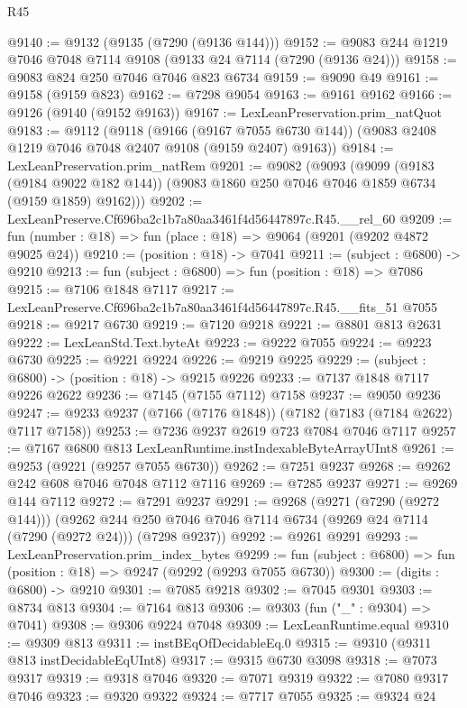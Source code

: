 \begin{lexlean}{R45}
\begin{coremodule}
{@9140 := @9132 (@9135 (@7290 (@9136 @144)))
@9152 := @9083 @244 @1219 @7046 @7048 @7114 @9108 (@9133 @24 @7114 (@7290 (@9136 @24)))
@9158 := @9083 @824 @250 @7046 @7046 @823 @6734
@9159 := @9090 @49
@9161 := @9158 (@9159 @823)
@9162 := @7298 @9054
@9163 := @9161 @9162
@9166 := @9126 (@9140 (@9152 @9163))
@9167 := LexLeanPreservation.prim_natQuot
@9183 := @9112
    (@9118
      (@9166 (@9167 @7055 @6730 @144))
      (@9083 @2408 @1219 @7046 @7048 @2407 @9108 (@9159 @2407) @9163))
@9184 := LexLeanPreservation.prim_natRem
@9201 := @9082
    (@9093
      (@9099
        (@9183 (@9184 @9022 @182 @144))
        (@9083 @1860 @250 @7046 @7046 @1859 @6734 (@9159 @1859) @9162)))
@9202 := LexLeanPreserve.Cf696ba2c1b7a80aa3461f4d56447897c.R45.__rel_60
@9209 := fun (number : @18) => fun (place : @18) => @9064 (@9201 (@9202 @4872 @9025 @24))
@9210 := (position : @18) -> @7041
@9211 := (subject : @6800) -> @9210
@9213 := fun (subject : @6800) => fun (position : @18) => @7086
@9215 := @7106 @1848 @7117
@9217 := LexLeanPreserve.Cf696ba2c1b7a80aa3461f4d56447897c.R45.__fits_51 @7055
@9218 := @9217 @6730
@9219 := @7120 @9218
@9221 := @8801 @813 @2631
@9222 := LexLeanStd.Text.byteAt
@9223 := @9222 @7055
@9224 := @9223 @6730
@9225 := @9221 @9224
@9226 := @9219 @9225
@9229 := (subject : @6800) -> (position : @18) -> @9215 @9226
@9233 := @7137 @1848 @7117 @9226 @2622
@9236 := @7145 (@7155 @7112) @7158
@9237 := @9050 @9236
@9247 := @9233 @9237 (@7166 (@7176 @1848)) (@7182 (@7183 (@7184 @2622) @7117 @7158))
@9253 := @7236 @9237 @2619 @723 @7084 @7046 @7117
@9257 := @7167 @6800 @813 LexLeanRuntime.instIndexableByteArrayUInt8
@9261 := @9253 (@9221 (@9257 @7055 @6730))
@9262 := @7251 @9237
@9268 := @9262 @242 @608 @7046 @7048 @7112 @7116
@9269 := @7285 @9237
@9271 := @9269 @144 @7112
@9272 := @7291 @9237
@9291 := @9268
    (@9271 (@7290 (@9272 @144)))
    (@9262 @244 @250 @7046 @7046 @7114 @6734 (@9269 @24 @7114 (@7290 (@9272 @24))) (@7298 @9237))
@9292 := @9261 @9291
@9293 := LexLeanPreservation.prim_index_bytes
@9299 := fun (subject : @6800) => fun (position : @18) => @9247 (@9292 (@9293 @7055 @6730))
@9300 := (digits : @6800) -> @9210
@9301 := @7085 @9218
@9302 := @7045 @9301
@9303 := @8734 @813
@9304 := @7164 @813
@9306 := @9303 (fun ("_" : @9304) => @7041)
@9308 := @9306 @9224 @7048
@9309 := LexLeanRuntime.equal
@9310 := @9309 @813
@9311 := instBEqOfDecidableEq.{0}
@9315 := @9310 (@9311 @813 instDecidableEqUInt8)
@9317 := @9315 @6730 @3098
@9318 := @7073 @9317
@9319 := @9318 @7046
@9320 := @7071 @9319
@9322 := @7080 @9317 @7046
@9323 := @9320 @9322
@9324 := @7717 @7055
@9325 := @9324 @24
}
\end{coremodule}
\end{lexlean}
